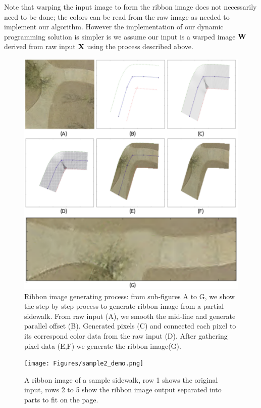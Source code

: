 Note that warping the input image to form the ribbon image does not necessarily need to be done; 
the colors can be read from the raw image as needed to implement 
our algorithm. However the implementation of our dynamic programming solution
is simpler is we assume our input is a warped image $\mathbf{W}{}$
derived from raw input $\mathbf{X}{}$ using the process described above. 

\begin{figure}[H]
    \centering
    \includegraphics[width=\textwidth]{Figures/straghten.pdf}
    \caption[Ribbon Image Generation]{
    Ribbon image generating process: 
    from sub-figures A to G, 
    we show the step by step process to generate ribbon-image 
    from a partial sidewalk.
     From raw input (A), we smooth the mid-line and generate parallel offset (B). 
     Generated pixels (C) and connected each pixel to its correspond color data 
     from the raw input (D). 
     After gathering pixel data (E,F) we generate the ribbon image(G).}
    \label{fig:StraightenProcess}
\end{figure}

\begin{figure}
    \centering
    \texttt{[image: Figures/sample2\_demo.png]}
    \caption[Sample Sidewalk 2]{
    A ribbon image of a sample sidewalk, 
    row 1 shows the original input, 
    rows 2 to 5 show the ribbon image output separated into parts to fit on the page.}
    \label{fig:Sample_Sidewalk_2}
\end{figure}

